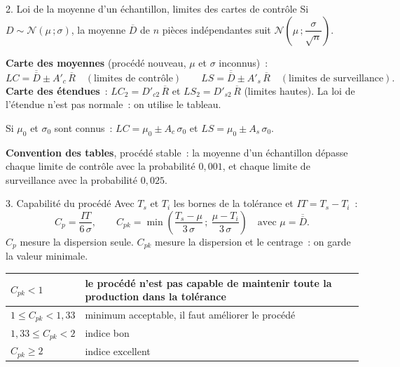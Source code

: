 \documentclass[a4paper,11pt]{article}
\newcommand{\Dbar}{\overline{D}}
\newcommand{\Dbb}{\overline{\overline{D}}}
\newcommand{\Rbar}{\overline{R}}
\begin{document}
\begin{rappel}{2. Loi de la moyenne d'un échantillon, limites des cartes de contrôle}
\small
Si $D \sim \mathcal{N}(\mu\,;\sigma)$, la moyenne $\Dbar$ de $n$ pièces indépendantes suit $\mathcal{N}\!\left(\mu\,;\dfrac{\sigma}{\sqrt{n}}\right)$.

\smallskip
\textbf{Carte des moyennes} (procédé nouveau, $\mu$ et $\sigma$ inconnus)~:
\[
LC = \Dbb \pm A'_c\,\Rbar \quad(\text{limites de contrôle}) \qquad LS = \Dbb \pm A'_s\,\Rbar \quad(\text{limites de surveillance}).
\]
\textbf{Carte des étendues}~: $LC_2 = D'_{c2}\,\Rbar$ et $LS_2 = D'_{s2}\,\Rbar$ (limites hautes). La loi de l'étendue n'est pas normale~: on utilise le tableau.

\smallskip
Si $\mu_0$ et $\sigma_0$ sont connus~: $LC = \mu_0 \pm A_c\,\sigma_0$ et $LS = \mu_0 \pm A_s\,\sigma_0$.

\smallskip
\textbf{Convention des tables}, procédé stable~: la moyenne d'un échantillon dépasse chaque limite de contrôle avec la probabilité $0{,}001$, et chaque limite de surveillance avec la probabilité $0{,}025$.
\end{rappel}

\begin{rappel}{3. Capabilité du procédé}
\small
Avec $T_s$ et $T_i$ les bornes de la tolérance et $IT = T_s - T_i$~:
\[
C_p = \frac{IT}{6\,\sigma}, \qquad C_{pk} = \min\!\left(\frac{T_s - \mu}{3\,\sigma}\,;\ \frac{\mu - T_i}{3\,\sigma}\right) \quad\text{avec } \mu = \Dbb.
\]
$C_p$ mesure la dispersion seule. $C_{pk}$ mesure la dispersion et le centrage~: on garde la valeur minimale.

\smallskip
\begin{center}\small
\renewcommand{\arraystretch}{1.15}
\begin{tabular}{|l|l|}\hline
$C_{pk} < 1$ & le procédé n'est pas capable de maintenir toute la production dans la tolérance \\ \hline
$1 \leq C_{pk} < 1{,}33$ & minimum acceptable, il faut améliorer le procédé \\ \hline
$1{,}33 \leq C_{pk} < 2$ & indice bon \\ \hline
$C_{pk} \geq 2$ & indice excellent \\ \hline
\end{tabular}
\end{center}
\end{rappel}
\end{document}
